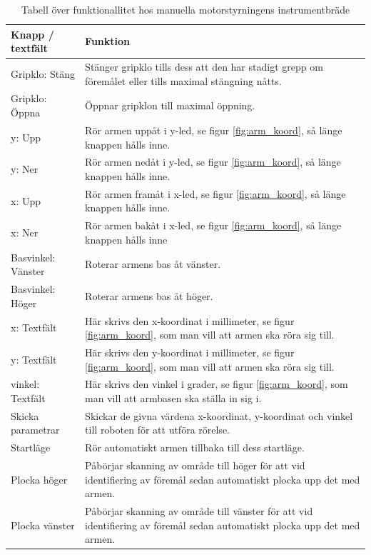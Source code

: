 \documentclass[a4paper,12pt]{article}
\begin{document}
\begin{table}[H]
    \centering
    \begin{tabularx}{\textwidth}{|l|X|}
        \hline \textbf{Knapp / textfält} & \textbf{Funktion} \\ \hline
        Gripklo: Stäng& Stänger gripklo tills dess att den har stadigt grepp om föremålet eller tills maximal stängning nåtts. \\ \hline
        Gripklo: Öppna& Öppnar gripklon till maximal öppning. \\ \hline
        y: Upp & Rör armen uppåt i y-led, se figur \ref{fig:arm_koord}, så länge knappen hålls inne. \\ \hline
        y: Ner & Rör armen nedåt i y-led, se figur \ref{fig:arm_koord}, så länge knappen hålls inne. \\ \hline
        x: Upp & Rör armen framåt i x-led, se figur \ref{fig:arm_koord}, så länge knappen hålls inne. \\ \hline
        x: Ner & Rör armen bakåt i x-led, se figur \ref{fig:arm_koord}, så länge knappen hålls inne \\ \hline
        Basvinkel: Vänster & Roterar armens bas åt vänster. \\ \hline
        Basvinkel: Höger & Roterar armens bas åt höger. \\ \hline
        x: Textfält & Här skrivs den x-koordinat i millimeter, se figur \ref{fig:arm_koord}, som man vill att armen ska röra sig till. \\ \hline
        y: Textfält & Här skrivs den y-koordinat i millimeter, se figur \ref{fig:arm_koord}, som man vill att armen ska röra sig till. \\ \hline
        vinkel: Textfält & Här skrivs den vinkel i grader, se figur \ref{fig:arm_koord}, som man vill att armbasen ska ställa in sig i. \\ \hline
        Skicka parametrar & Skickar de givna värdena x-koordinat, y-koordinat och vinkel till roboten för att utföra rörelse. \\ \hline
        Startläge & Rör automatiskt armen tillbaka till dess startläge. \\ \hline
        Plocka höger & Påbörjar skanning av område till höger för att vid identifiering av föremål sedan automatiskt plocka upp det med armen. \\ \hline
        Plocka vänster & Påbörjar skanning av område till vänster för att vid identifiering av föremål sedan automatiskt plocka upp det med armen. \\ \hline
    \end{tabularx}
\caption{Tabell över funktionallitet hos manuella motorstyrningens instrumentbräde}
\label{tab:arm}
\end{table}
\end{document}
